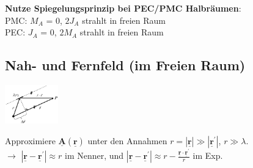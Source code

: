 \documentclass[english]{latex4ei/latex4ei_sheet}
\renewcommand{\vec}[1]{\underline{\boldsymbol{#1}}}
\begin{document}
\begin{sectionbox}
	\textbf{Nutze Spiegelungsprinzip bei PEC/PMC Halbräumen}:\\
	PMC: $M_A$ = 0, $2J_A$ strahlt in freien Raum\\
	PEC: $J_A$ = 0, $2M_A$ strahlt in freien Raum\\
\end{sectionbox}

\begin{sectionbox}
	\subsection{Nah- und Fernfeld (im Freien Raum)}
	
	\begin{center}\includegraphics[width = 2.3cm]{./img/fernfeld.png}\end{center}

	Approximiere $\vec{A}(\vec{r})$ unter den Annahmen $r = |\vec{r}|\gg |\vec{r}^{\prime}|$, $r \gg \lambda$.\\
	$\rightarrow$ $|\vec{r} - \vec{r}^{\prime}| \approx r$ im Nenner, und $|\vec{r} - \vec{r}^{\prime}| \approx r - \frac{\vec{r}\cdot\vec{r}^{\prime}}{r}$ im Exp.\\


\end{sectionbox}
\end{document}
